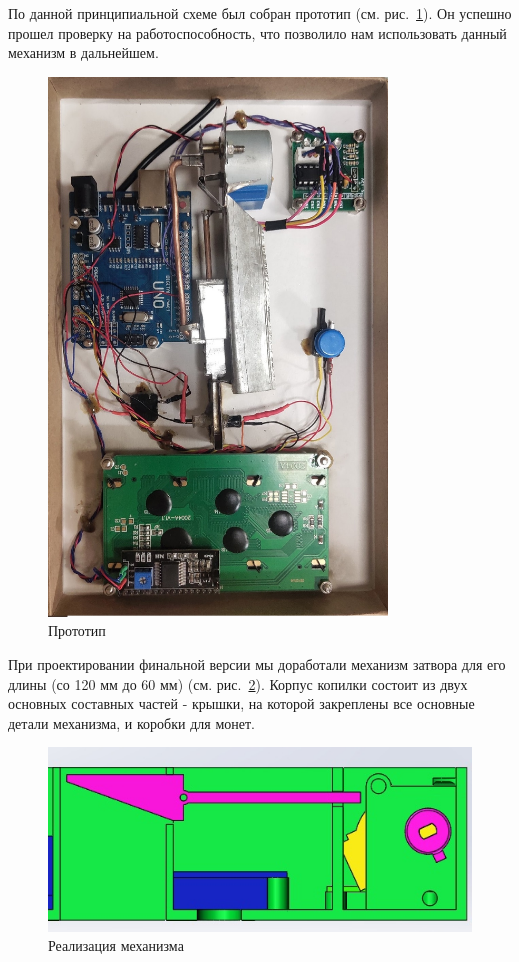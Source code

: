 По данной принципиальной схеме был собран прототип (см. рис.~\ref{ris:proto}). Он успешно прошел проверку на работоспособность, что позволило нам использовать данный механизм в дальнейшем.

\begin{figure}[H]
	\centering
	\includegraphics[width=9cm]{proto.jpg}
	\caption{Прототип}
	\label{ris:proto}
\end{figure}
\par\medskip

При проектировании финальной версии мы доработали механизм затвора для его длины (со 120 мм до 60 мм) (см. рис.~\ref{ris:mechan}). Корпус копилки состоит из двух основных составных частей - крышки, на которой закреплены все основные детали механизма, и коробки для монет. 

\begin{figure}[H]
	\centering
	\includegraphics[width=12cm]{mechan.jpg}
	\caption{Реализация механизма}
	\label{ris:mechan}
\end{figure}
\par\medskip

